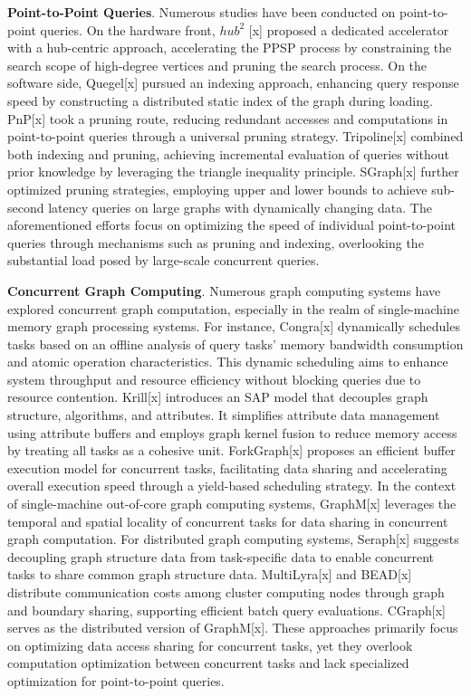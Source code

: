 \documentclass[lettersize,journal]{IEEEtran} %
\begin{document}
{\bf{Point-to-Point Queries}}. Numerous studies have been conducted on point-to-point queries. On the hardware front, $hub^2$ [x] proposed a dedicated accelerator with a hub-centric approach, accelerating the PPSP process by constraining the search scope of high-degree vertices and pruning the search process. On the software side, Quegel[x] pursued an indexing approach, enhancing query response speed by constructing a distributed static index of the graph during loading. PnP[x] took a pruning route, reducing redundant accesses and computations in point-to-point queries through a universal pruning strategy. Tripoline[x] combined both indexing and pruning, achieving incremental evaluation of queries without prior knowledge by leveraging the triangle inequality principle. SGraph[x] further optimized pruning strategies, employing upper and lower bounds to achieve sub-second latency queries on large graphs with dynamically changing data. The aforementioned efforts focus on optimizing the speed of individual point-to-point queries through mechanisms such as pruning and indexing, overlooking the substantial load posed by large-scale concurrent queries.

{\bf{Concurrent Graph Computing}}. Numerous graph computing systems have explored concurrent graph computation, especially in the realm of single-machine memory graph processing systems. For instance, Congra[x] dynamically schedules tasks based on an offline analysis of query tasks' memory bandwidth consumption and atomic operation characteristics. This dynamic scheduling aims to enhance system throughput and resource efficiency without blocking queries due to resource contention. Krill[x] introduces an SAP model that decouples graph structure, algorithms, and attributes. It simplifies attribute data management using attribute buffers and employs graph kernel fusion to reduce memory access by treating all tasks as a cohesive unit. ForkGraph[x] proposes an efficient buffer execution model for concurrent tasks, facilitating data sharing and accelerating overall execution speed through a yield-based scheduling strategy. In the context of single-machine out-of-core graph computing systems, GraphM[x] leverages the temporal and spatial locality of concurrent tasks for data sharing in concurrent graph computation. For distributed graph computing systems, Seraph[x] suggests decoupling graph structure data from task-specific data to enable concurrent tasks to share common graph structure data. MultiLyra[x] and BEAD[x] distribute communication costs among cluster computing nodes through graph and boundary sharing, supporting efficient batch query evaluations. CGraph[x] serves as the distributed version of GraphM[x]. These approaches primarily focus on optimizing data access sharing for concurrent tasks, yet they overlook computation optimization between concurrent tasks and lack specialized optimization for point-to-point queries.
\end{document}
